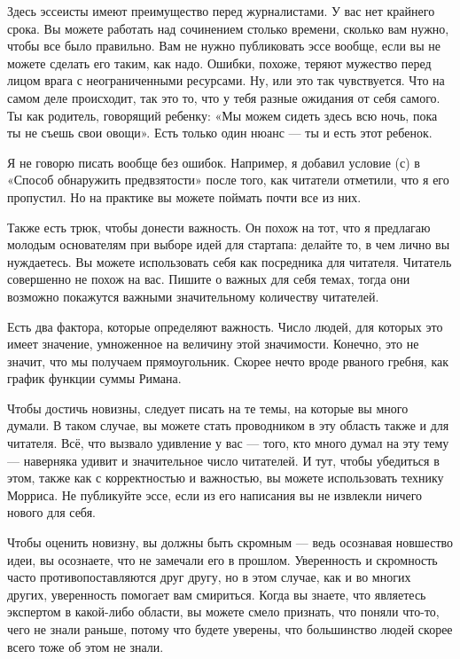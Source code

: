 \documentclass[ebook,12pt,oneside,openany]{memoir}
\begin{document}
Здесь эссеисты имеют преимущество перед журналистами. У вас нет
крайнего срока. Вы можете работать над сочинением столько времени,
сколько вам нужно, чтобы все было правильно. Вам не нужно публиковать
эссе вообще, если вы не можете сделать его таким, как надо. Ошибки,
похоже, теряют мужество перед лицом врага с неограниченными ресурсами.
Ну, или это так чувствуется. Что на самом деле происходит, так это то,
что у тебя разные ожидания от себя самого. Ты как родитель, говорящий
ребенку: «Мы можем сидеть здесь всю ночь, пока ты не съешь свои
овощи». Есть только один нюанс — ты и есть этот ребенок.

Я не говорю писать вообще без ошибок. Например, я добавил условие (с)
в «Способ обнаружить предвзятости» после того, как читатели отметили,
что я его пропустил. Но на практике вы можете поймать почти все из
них.

Также есть трюк, чтобы донести важность. Он похож на тот, что я
предлагаю молодым основателям при выборе идей для стартапа: делайте
то, в чем лично вы нуждаетесь. Вы можете использовать себя как
посредника для читателя. Читатель совершенно не похож на вас. Пишите о
важных для себя темах, тогда они возможно покажутся важными
значительному количеству читателей.

Есть два фактора, которые определяют важность. Число людей, для
которых это имеет значение, умноженное на величину этой значимости.
Конечно, это не значит, что мы получаем прямоугольник. Скорее нечто
вроде рваного гребня, как график функции суммы Римана.

Чтобы достичь новизны, следует писать на те темы, на которые вы много
думали. В таком случае, вы можете стать проводником в эту область
также и для читателя. Всё, что вызвало удивление у вас — того, кто
много думал на эту тему — наверняка удивит и значительное число
читателей. И тут, чтобы убедиться в этом, также как с корректностью и
важностью, вы можете использовать технику Морриса. Не публикуйте эссе,
если из его написания вы не извлекли ничего нового для себя.

Чтобы оценить новизну, вы должны быть скромным — ведь осознавая
новшество идеи, вы осознаете, что не замечали его в прошлом.
Уверенность и скромность часто противопоставляются друг другу, но в
этом случае, как и во многих других, уверенность помогает вам
смириться. Когда вы знаете, что являетесь экспертом в какой-либо
области, вы можете смело признать, что поняли что-то, чего не знали
раньше, потому что будете уверены, что большинство людей скорее всего
тоже об этом не знали.
\end{document}

